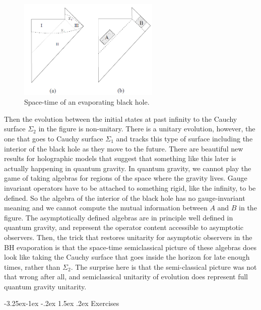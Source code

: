 \documentclass[11pt,a4paper]{article}
\makeatletter
\renewcommand\subsection{\@startsection{subsection}{2}{\z@}%
                                   {-3.25ex\@plus -1ex \@minus -.2ex}%
                                     {1.5ex \@plus .2ex}%
                                     {\normalfont\bfseries}}
\numberwithin{equation}{section}
\makeatother
\begin{document}
\begin{figure}[t]
\begin{center}  
\includegraphics[width=0.6\textwidth]{imagen2.png}
\captionsetup{width=0.9\textwidth}
\caption{Space-time of an evaporating black hole.}
\label{bibo}
\end{center}  
\end{figure}   


Then the evolution between the initial states at past infinity to the Cauchy surface $\Sigma_2$ in the figure is non-unitary. There is a unitary evolution, however, the one that goes to Cauchy surface $\Sigma_1$ and tracks this type of surface including the interior of the black hole as they move to the future. There are beautiful new results for holographic models that suggest that something like this later is actually happening in quantum gravity. In quantum gravity, we cannot play the game of taking algebras for regions of the space where the gravity lives. Gauge invariant operators have to be attached to something rigid, like the infinity, to be defined. So the algebra of the interior of the black hole has no gauge-invariant meaning and we cannot compute the mutual information between $A$ and $B$ in the figure. The asymptotically defined algebras are in principle well defined in quantum gravity, and represent the operator content accessible to asymptotic observers. Then, the trick that restores unitarity for asymptotic observers in the BH evaporation is that the space-time semiclassical picture of these algebras does look like taking the Cauchy surface that goes inside the horizon for late enough times, rather than $\Sigma_2$. The surprise here is that the semi-classical picture was not that wrong after all, and semiclassical unitarity of evolution does represent full quantum gravity unitarity.      

\subsection{Exercises}
\end{document}
